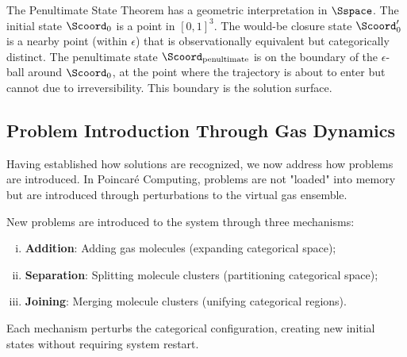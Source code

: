\begin{remark}
\label{rem:geometric_penultimate}
The Penultimate State Theorem has a geometric interpretation in $\Sspace$. The initial state $\Scoord_0$ is a point in $[0,1]^3$. The would-be closure state $\Scoord_0'$ is a nearby point (within $\epsilon$) that is observationally equivalent but categorically distinct. The penultimate state $\Scoord_{\text{penultimate}}$ is on the boundary of the $\epsilon$-ball around $\Scoord_0$, at the point where the trajectory is about to enter but cannot due to irreversibility. This boundary is the solution surface.
\end{remark}

\subsection{Problem Introduction Through Gas Dynamics}

Having established how solutions are recognized, we now address how problems are introduced. In Poincaré Computing, problems are not "loaded" into memory but are introduced through perturbations to the virtual gas ensemble.

\begin{theorem}
\label{thm:problem_introduction}
New problems are introduced to the system through three mechanisms:
\begin{enumerate}[(i)]
    \item \textbf{Addition}: Adding gas molecules (expanding categorical space);
    \item \textbf{Separation}: Splitting molecule clusters (partitioning categorical space);
    \item \textbf{Joining}: Merging molecule clusters (unifying categorical regions).
\end{enumerate}
Each mechanism perturbs the categorical configuration, creating new initial states without requiring system restart.
\end{theorem}

